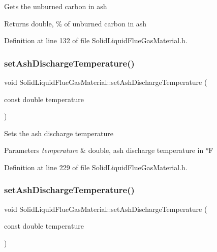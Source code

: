 Gets the unburned carbon in ash \begin{DoxyReturn}{Returns}
double, \% of unburned carbon in ash 
\end{DoxyReturn}


Definition at line 132 of file Solid\+Liquid\+Flue\+Gas\+Material.\+h.

\mbox{\label{class_solid_liquid_flue_gas_material_ad29543a88737c3d051c7d824287bc791}} 
\subsubsection{\texorpdfstring{set\+Ash\+Discharge\+Temperature()}{setAshDischargeTemperature()}\hspace{0.1cm}{\footnotesize\ttfamily [1/3]}}
{\footnotesize\ttfamily void Solid\+Liquid\+Flue\+Gas\+Material\+::set\+Ash\+Discharge\+Temperature (\begin{DoxyParamCaption}\item[{const double}]{temperature }\end{DoxyParamCaption})\hspace{0.3cm}{\ttfamily [inline]}}

Sets the ash discharge temperature 
\begin{DoxyParams}{Parameters}
{\em temperature} & double, ash discharge temperature in °F \\
\hline
\end{DoxyParams}


Definition at line 229 of file Solid\+Liquid\+Flue\+Gas\+Material.\+h.

\mbox{\label{class_solid_liquid_flue_gas_material_ad29543a88737c3d051c7d824287bc791}} 
\subsubsection{\texorpdfstring{set\+Ash\+Discharge\+Temperature()}{setAshDischargeTemperature()}\hspace{0.1cm}{\footnotesize\ttfamily [2/3]}}
{\footnotesize\ttfamily void Solid\+Liquid\+Flue\+Gas\+Material\+::set\+Ash\+Discharge\+Temperature (\begin{DoxyParamCaption}\item[{const double}]{temperature }\end{DoxyParamCaption})\hspace{0.3cm}{\ttfamily [inline]}}


